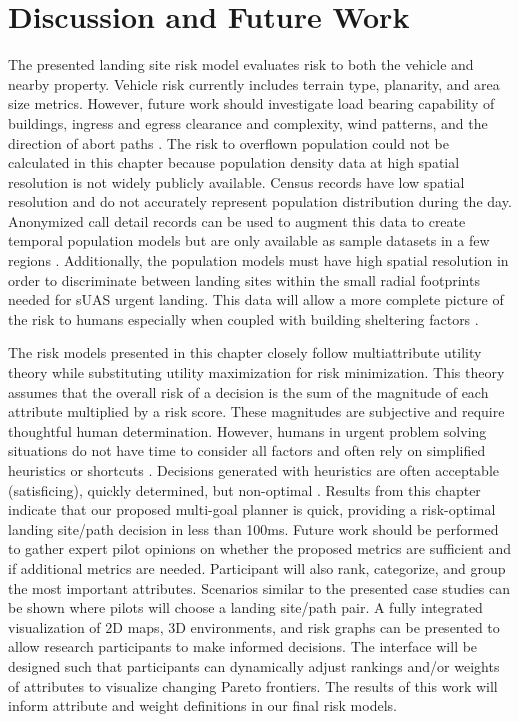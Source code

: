 \section{Discussion and Future Work}


The presented landing site risk model evaluates risk to both the vehicle and nearby property. Vehicle risk currently includes terrain type, planarity, and area size metrics. However, future work should investigate load bearing capability of buildings, ingress and egress clearance and complexity, wind patterns, and the direction of abort paths \cite{scherer_autonomous_2012}. The risk to overflown population could not be calculated in this chapter because population density data at high spatial resolution is not widely publicly available.  Census records have low spatial resolution and do not accurately represent population distribution during the day. Anonymized call detail records can be used to augment this data to create temporal population models but are only available as sample datasets in a few regions \cite{di_donato_evaluating_2017}. Additionally, the population models must have high spatial resolution in order to discriminate between landing sites within the small radial footprints needed for sUAS urgent landing. This data will allow a more complete picture of the risk to humans especially when coupled with building sheltering factors \cite{melnyk_third-party_2014-1}.

The risk models presented in this chapter closely follow multiattribute utility theory while substituting utility maximization for risk minimization\cite{Wickens2015}. This theory assumes that the overall risk of a decision is the sum of the magnitude of each attribute multiplied by a risk score. These magnitudes are subjective and require thoughtful human determination. However, humans in urgent problem solving situations do not have time to consider all factors and often rely on simplified heuristics or shortcuts \cite{2003_technical_review_human_error}. Decisions generated with heuristics are often acceptable (satisficing), quickly determined, but non-optimal \cite{wickens_5_1988}. Results from this chapter indicate that our proposed multi-goal planner is quick, providing a risk-optimal landing site/path decision in less than 100ms. Future work should be performed to gather expert pilot opinions on whether the proposed metrics are sufficient and if additional metrics are needed. Participant will also rank, categorize, and group the most important attributes. Scenarios similar to the presented case studies can be shown where pilots will choose a landing site/path pair. A fully integrated visualization of 2D maps, 3D environments, and risk graphs can be presented to allow research participants to make informed decisions. The interface will be designed such that participants can dynamically adjust rankings and/or weights of attributes to visualize changing Pareto frontiers. The results of this work will inform attribute and weight definitions in our final risk models.

